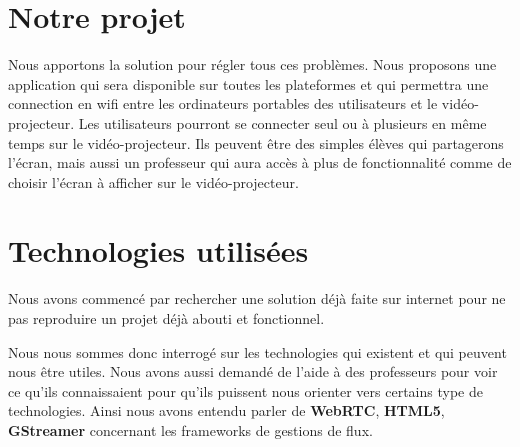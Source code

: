 \documentclass[a4paper, 11pt]{article}
\begin{document}
\section{Notre projet}

Nous apportons la solution pour régler tous ces problèmes. Nous proposons une application qui sera disponible sur toutes les plateformes et qui permettra une connection en wifi entre les ordinateurs portables des utilisateurs et le vidéo-projecteur. Les utilisateurs pourront se connecter seul ou à plusieurs en même temps sur le vidéo-projecteur. Ils peuvent être des simples élèves qui partagerons l'écran, mais aussi un professeur qui aura accès à plus de fonctionnalité comme de choisir l'écran à afficher sur le vidéo-projecteur.

\section{Technologies utilisées}

Nous avons commencé par rechercher une solution déjà faite sur internet pour ne pas reproduire un projet déjà abouti et fonctionnel. 

Nous nous sommes donc interrogé sur les technologies qui existent et qui peuvent nous être utiles. Nous avons aussi demandé de l'aide à des professeurs pour voir ce qu'ils connaissaient pour qu'ils puissent nous orienter vers certains type de technologies. Ainsi nous avons entendu parler de \textbf{WebRTC}, \textbf{HTML5}, \textbf{GStreamer} concernant les frameworks de gestions de flux. 
\end{document}
